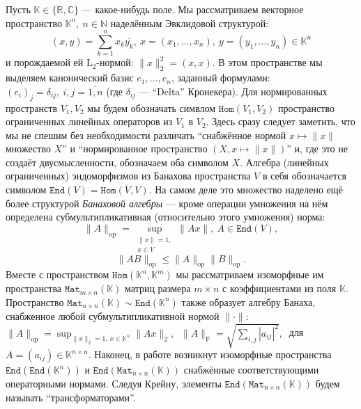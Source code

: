 \documentclass[14pt,a4paper]{extarticle}
\theoremstyle{definition}
\begin{document}
Пусть \( \mathbb{K}\in \{ \mathbb{R}, \mathbb{C} \} \)
--- какое-нибудь поле.
Мы рассматриваем векторное пространство \( \mathbb{K}^n,\ n\in \mathbb{N} \)
наделённым Эвклидовой структурой:
    \[
        (x, y){=}\sum_{k=1}^n x_k\overline{y_k},
        \ x{=}(x_1,\ldots, x_n),
        \ y=(y_1,\ldots, y_n)
        \in \mathbb{K}^n
        \]
    и порождаемой ей \( \mathrm{L}_2 \)-нормой:
    \(
        \|x\|_2^2{=}(x,x).
        \)
В этом пространстве мы выделяем канонический базис \( e_1, \ldots, e_n \),
        заданный формулами:
        \( {(e_i)}_j = \delta_{ij},\ i,j=\overline{1,n} \)
    (где \(\delta_{ij} \) --- ``Delta'' Кронекера).
Для нормированных пространств \( V_1, V_2 \) 
    мы будем обозначать симвлом \( \mathtt{Hom}(V_1, V_2) \)
    пространство ограни\-ченных линейных операторов
    из \( V_1 \) в \( V_2 \).
Здесь сразу следует заметить, что мы не спешим без необходимости различать
``снабжённое нормой \(x\mapsto \|x\| \) множество \( X \)''
и ``нормированное пространство \( (X, x\mapsto \|x\|) \)''
и, где это не создаёт двусмысленности, обозначаем оба символом \( X \).
Алгебра (линейных ограниченных) эндоморфизмов
    из Банахова пространства \( V \)
    в себя обозначается символом \( \mathtt{End}(V) = \mathtt{Hom}(V, V) \).
На самом деле это множество наделено ещё более структурой \emph{Банаховой
  алгебры} --- кроме операции умножения на нём определена суб\-мульти\-пликатив\-ная
(относительно этого умножения) норма:
    \[
        \|A\|_{\mathrm{op}} =
        \sup_{
            \substack{\|x\|=1,\\ x\in V}
        } \|A x\|,\ A\in \mathtt{End}(V),
        \]
     \[
       \|AB\|_{\mathrm{op}} \leq \|A\|_{\mathrm{op}} \|B\|_{\mathrm{op}}.
        \]
Вместе с пространством \( \mathtt{Hom}(\mathbb{K}^n, \mathbb{K}^m) \)
    мы рассматриваем изоморфные им пространства \(
    \mathtt{Mat}_{m{\times}n}(\mathbb{K}) \)
    матриц размера \( m{\times}n \)
    с коэффициентами из поля \( \mathbb{K} \).
Пространство \( \mathtt{Mat}_{n{\times}n}(\mathbb{K})\sim
\mathtt{End}(\mathbb{K}^n) \)
также образует алгебру Банаха, снабженное любой суб\-мульти\-пликатив\-ной нормой
    \( \|\cdot\| \):
    \( \|A\|_{\mathrm{op}} = \sup_{\|x\|_2=1,\ x\in \mathbb{K}^n} \|A x\|_2,\ \)
    \( \|A\|_{\mathrm{F}} = \sqrt{\sum_{i,j} |a_{ij}|^2},\ \)
    для 
    \( A{=}(a_{ij})\in\mathbb{K}^{n\times n} \).
Наконец, в работе возникнут изоморфные пространства
    \( \mathtt{End}(\mathtt{End}(\mathbb{K}^n)) \) и \(
    \mathtt{End}(\mathtt{Mat}_{n{\times}n}(\mathbb{K})) \)
    снабжённые соответствующими операторными нормами.
Следуя Крейну, элементы \( \mathtt{End}(\mathtt{Mat}_{n{\times}n}(\mathbb{K})) \)
    будем называть ``транс\-форм\-аторами''.
\end{document}
